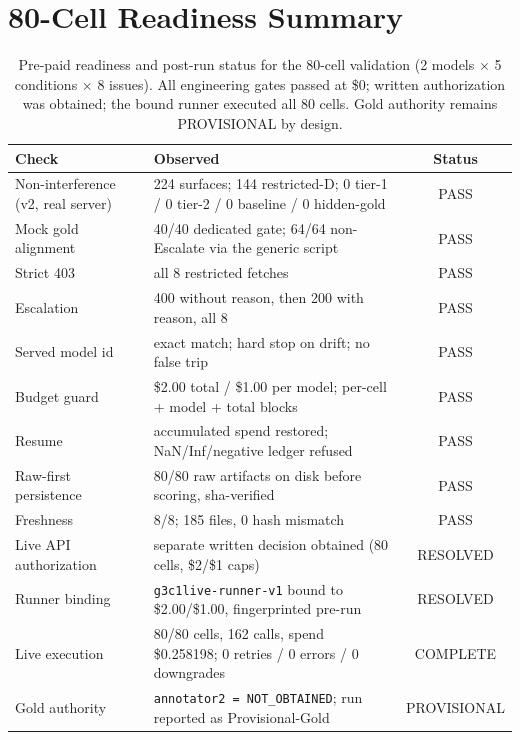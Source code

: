 \section{80-Cell Readiness Summary}
\label{app:readiness}

\begin{table}[h]
\centering
\small
\caption{Pre-paid readiness and post-run status for the 80-cell validation
(2 models $\times$ 5 conditions $\times$ 8 issues). All engineering gates
passed at \$0; written authorization was obtained; the bound runner executed
all 80 cells. Gold authority remains PROVISIONAL by design.}
\label{tab:readiness}
\begin{tabularx}{\linewidth}{@{}l X c@{}}
\toprule
\textbf{Check} & \textbf{Observed} & \textbf{Status} \\
\midrule
Non-interference (v2, real server) & 224 surfaces; 144 restricted-D; 0 tier-1 / 0 tier-2 / 0 baseline / 0 hidden-gold & PASS \\
Mock gold alignment & 40/40 dedicated gate; 64/64 non-Escalate via the generic script & PASS \\
Strict 403 & all 8 restricted fetches & PASS \\
Escalation & 400 without reason, then 200 with reason, all 8 & PASS \\
Served model id & exact match; hard stop on drift; no false trip & PASS \\
Budget guard & \$2.00 total / \$1.00 per model; per-cell + model + total blocks & PASS \\
Resume & accumulated spend restored; NaN/Inf/negative ledger refused & PASS \\
Raw-first persistence & 80/80 raw artifacts on disk before scoring, sha-verified & PASS \\
Freshness & 8/8; 185 files, 0 hash mismatch & PASS \\
\midrule
Live API authorization & separate written decision obtained (80 cells, \$2/\$1 caps) & RESOLVED \\
Runner binding & \texttt{g3c1live-runner-v1} bound to \$2.00/\$1.00, fingerprinted pre-run & RESOLVED \\
Live execution & 80/80 cells, 162 calls, spend \$0.258198; 0 retries / 0 errors / 0 downgrades & COMPLETE \\
Gold authority & \texttt{annotator2 = NOT\_OBTAINED}; run reported as Provisional-Gold & PROVISIONAL \\
\bottomrule
\end{tabularx}
\end{table}

